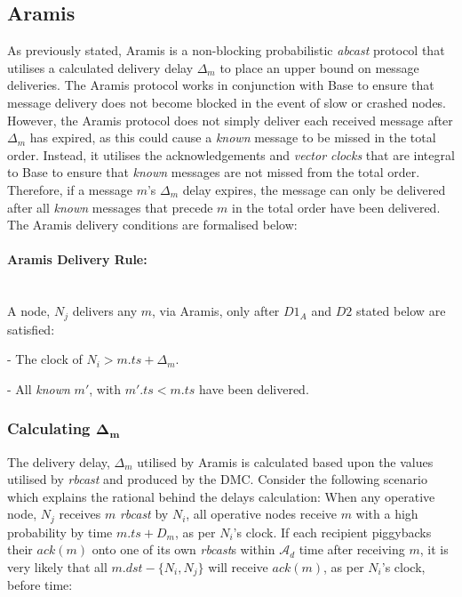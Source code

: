    \subsection{Aramis}\label{ssec:aramis}
    As previously stated,  \textsf{Aramis} is a non-blocking probabilistic \emph{abcast} protocol that utilises a calculated delivery delay $\Delta_m$ to place an upper bound on message deliveries.  The \textsf{Aramis} protocol works in conjunction with \textsf{Base} to ensure that message delivery does not become blocked in the event of slow or crashed nodes.  However, the \textsf{Aramis} protocol does not simply deliver each received message after $\Delta_m$ has expired, as this could cause a \emph{known} message to be missed in the total order.  Instead, it utilises the acknowledgements and \emph{vector clocks} that are integral to \textsf{Base} to ensure that \emph{known} messages are not missed from the total order.  Therefore, if a message $m$'s $\Delta_m$ delay expires, the message can only be delivered after all \emph{known} messages that precede $m$ in the total order have been delivered.  The \textsf{Aramis} delivery conditions are formalised below:
    
    \paragraph{\textsf{Aramis} Delivery Rule:}\hspace{0pt} \\
        A node, $N_j$ delivers any $m$, via \textsf{Aramis}, only after $D1_A$ and $D2$ stated below are satisfied:
        \begin{description}[labelindent=1cm]
            \item[$\boldsymbol{D1_A}$] - The clock of $N_i > m.ts + \Delta_{m}$. 
            \item[$\boldsymbol{D2}$] - All \emph{known} $m'$, with $m'.ts < m.ts$ have been delivered.
        \end{description}
    
    
        \subsubsection*{Calculating $\boldsymbol{\Delta_m}$    }
        The delivery delay, $\Delta_m$ utilised by \textsf{Aramis} is calculated based upon the values utilised by \emph{rbcast} and produced by the DMC.  Consider the following scenario which explains the rational behind the delays calculation: When any operative node, $N_j$ receives $m$ \emph{rbcast} by $N_i$, all operative nodes receive $m$ with a high probability by time $m.ts + D_m$, as per $N_i$'s clock.  If each recipient piggybacks their $ack(m)$ onto one of its own \emph{rbcast}s within $\mathcal{A}_d$ time after receiving $m$, it is very likely that all $m.dst - \{N_i, N_j\}$ will receive $ack(m)$, as per $N_i$'s clock, before time:
        
